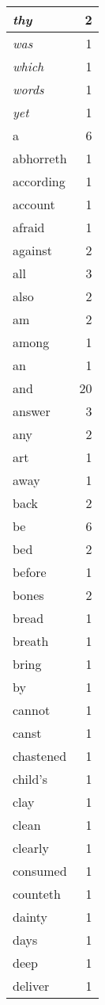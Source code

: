 \begin{center}
\begin{longtable}{l|r}
\emph{thy} & 2 \\ \hline
\emph{was} & 1 \\ \hline
\emph{which} & 1 \\ \hline
\emph{words} & 1 \\ \hline
\emph{yet} & 1 \\ \hline
a & 6 \\ \hline
abhorreth & 1 \\ \hline
according & 1 \\ \hline
account & 1 \\ \hline
afraid & 1 \\ \hline
against & 2 \\ \hline
all & 3 \\ \hline
also & 2 \\ \hline
am & 2 \\ \hline
among & 1 \\ \hline
an & 1 \\ \hline
and & 20 \\ \hline
answer & 3 \\ \hline
any & 2 \\ \hline
art & 1 \\ \hline
away & 1 \\ \hline
back & 2 \\ \hline
be & 6 \\ \hline
bed & 2 \\ \hline
before & 1 \\ \hline
bones & 2 \\ \hline
bread & 1 \\ \hline
breath & 1 \\ \hline
bring & 1 \\ \hline
by & 1 \\ \hline
cannot & 1 \\ \hline
canst & 1 \\ \hline
chastened & 1 \\ \hline
child's & 1 \\ \hline
clay & 1 \\ \hline
clean & 1 \\ \hline
clearly & 1 \\ \hline
consumed & 1 \\ \hline
counteth & 1 \\ \hline
dainty & 1 \\ \hline
days & 1 \\ \hline
deep & 1 \\ \hline
deliver & 1 \\ \hline

\end{longtable}
\end{center}
